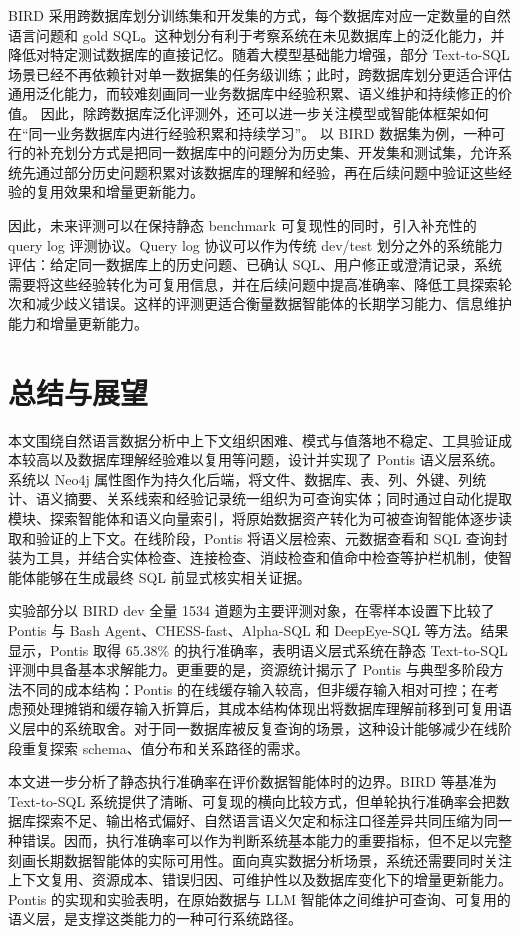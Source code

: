 \documentclass[
    bachelor,
    pdflinks,
]{xjtuthesis}
\begin{document}
BIRD 采用跨数据库划分训练集和开发集的方式，每个数据库对应一定数量的自然语言问题和 gold SQL。这种划分有利于考察系统在未见数据库上的泛化能力，并降低对特定测试数据库的直接记忆。随着大模型基础能力增强，部分 Text-to-SQL 场景已经不再依赖针对单一数据集的任务级训练；此时，跨数据库划分更适合评估通用泛化能力，而较难刻画同一业务数据库中经验积累、语义维护和持续修正的价值。
因此，除跨数据库泛化评测外，还可以进一步关注模型或智能体框架如何在“同一业务数据库内进行经验积累和持续学习”。
以 BIRD 数据集为例，一种可行的补充划分方式是把同一数据库中的问题分为历史集、开发集和测试集，允许系统先通过部分历史问题积累对该数据库的理解和经验，再在后续问题中验证这些经验的复用效果和增量更新能力。

因此，未来评测可以在保持静态 benchmark 可复现性的同时，引入补充性的 query log 评测协议。Query log 协议可以作为传统 dev/test 划分之外的系统能力评估：给定同一数据库上的历史问题、已确认 SQL、用户修正或澄清记录，系统需要将这些经验转化为可复用信息，并在后续问题中提高准确率、降低工具探索轮次和减少歧义错误。这样的评测更适合衡量数据智能体的长期学习能力、信息维护能力和增量更新能力。

\chapter{总结与展望}

本文围绕自然语言数据分析中上下文组织困难、模式与值落地不稳定、工具验证成本较高以及数据库理解经验难以复用等问题，设计并实现了 Pontis 语义层系统。系统以 Neo4j 属性图作为持久化后端，将文件、数据库、表、列、外键、列统计、语义摘要、关系线索和经验记录统一组织为可查询实体；同时通过自动化提取模块、探索智能体和语义向量索引，将原始数据资产转化为可被查询智能体逐步读取和验证的上下文。在线阶段，Pontis 将语义层检索、元数据查看和 SQL 查询封装为工具，并结合实体检查、连接检查、消歧检查和值命中检查等护栏机制，使智能体能够在生成最终 SQL 前显式核实相关证据。

实验部分以 BIRD dev 全量 1534 道题为主要评测对象，在零样本设置下比较了 Pontis 与 Bash Agent、CHESS-fast、Alpha-SQL 和 DeepEye-SQL 等方法。结果显示，Pontis 取得 65.38\% 的执行准确率，表明语义层式系统在静态 Text-to-SQL 评测中具备基本求解能力。更重要的是，资源统计揭示了 Pontis 与典型多阶段方法不同的成本结构：Pontis 的在线缓存输入较高，但非缓存输入相对可控；在考虑预处理摊销和缓存输入折算后，其成本结构体现出将数据库理解前移到可复用语义层中的系统取舍。对于同一数据库被反复查询的场景，这种设计能够减少在线阶段重复探索 schema、值分布和关系路径的需求。

本文进一步分析了静态执行准确率在评价数据智能体时的边界。BIRD 等基准为 Text-to-SQL 系统提供了清晰、可复现的横向比较方式，但单轮执行准确率会把数据库探索不足、输出格式偏好、自然语言语义欠定和标注口径差异共同压缩为同一种错误。因而，执行准确率可以作为判断系统基本能力的重要指标，但不足以完整刻画长期数据智能体的实际可用性。面向真实数据分析场景，系统还需要同时关注上下文复用、资源成本、错误归因、可维护性以及数据库变化下的增量更新能力。Pontis 的实现和实验表明，在原始数据与 LLM 智能体之间维护可查询、可复用的语义层，是支撑这类能力的一种可行系统路径。
\end{document}
